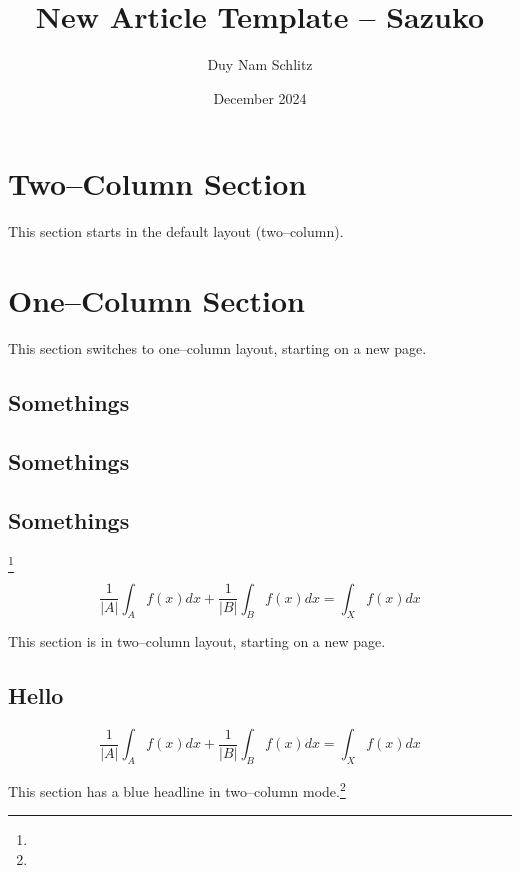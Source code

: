 \documentclass{sazuko}
\title{New Article Template -- Sazuko}
\author{Duy Nam Schlitz}
\date{December 2024}
\begin{document}
\maketitle

\tableofcontents

\newpage

\section{Two--Column Section}
This section starts in the default layout (two--column).

\lipsum[1-12]

\togglelayout

\section{One--Column Section}
This section switches to one--column layout, starting on a new page.

\subsection{Somethings}
\subsection{Somethings}
\subsection{Somethings}


\lipsum[1-4]\footnote{\lipsum[1]}

$$ \frac{1}{|A|} \int_A f(x) dx + \frac{1}{|B|} \int_B
f(x) dx = \int_X f(x) dx $$

\togglelayout

This section is in two--column layout, starting on a new page. \lipsum[1-9]

\subsection{Hello}

$$ \frac{1}{|A|} \int_A f(x) dx + \frac{1}{|B|} \int_B
f(x) dx = \int_X f(x) dx $$

This section has a blue headline in two--column mode.\footnote{\lipsum[1-2]}

\end{document}
